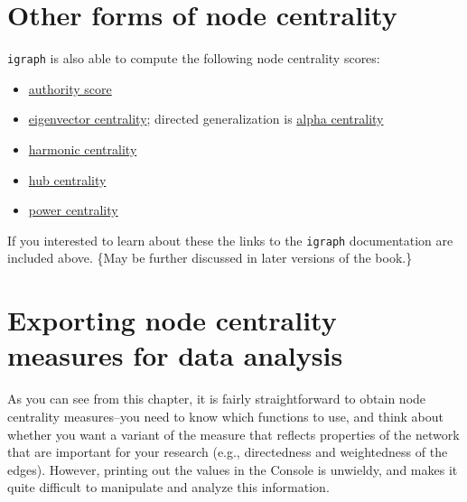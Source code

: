 \documentclass[
]{book}
\newenvironment{Shaded}{\begin{snugshade}}{\end{snugshade}}
\newcommand{\CommentTok}[1]{\textcolor[rgb]{0.56,0.35,0.01}{\textit{#1}}}
\providecommand{\tightlist}{%
  \setlength{\itemsep}{0pt}\setlength{\parskip}{0pt}}
\begin{document}
\begin{Shaded}
\end{Shaded}

\section{Other forms of node centrality}\label{other-forms-of-node-centrality}

\texttt{igraph} is also able to compute the following node centrality scores:

\begin{itemize}
\tightlist
\item
  \href{https://igraph.org/r/doc/authority_score.html}{authority score}
\item
  \href{https://igraph.org/r/doc/eigen_centrality.html}{eigenvector centrality}; directed generalization is \href{https://igraph.org/r/doc/alpha_centrality.html}{alpha centrality}
\item
  \href{https://igraph.org/r/doc/harmonic_centrality.html}{harmonic centrality}
\item
  \href{https://igraph.org/r/doc/hub_score.html}{hub centrality}
\item
  \href{https://igraph.org/r/doc/power_centrality.html}{power centrality}
\end{itemize}

If you interested to learn about these the links to the \texttt{igraph} documentation are included above. \{May be further discussed in later versions of the book.\}

\section{Exporting node centrality measures for data analysis}\label{exporting-node-centrality-measures-for-data-analysis}

As you can see from this chapter, it is fairly straightforward to obtain node centrality measures--you need to know which functions to use, and think about whether you want a variant of the measure that reflects properties of the network that are important for your research (e.g., directedness and weightedness of the edges). However, printing out the values in the Console is unwieldy, and makes it quite difficult to manipulate and analyze this information.
\end{document}
